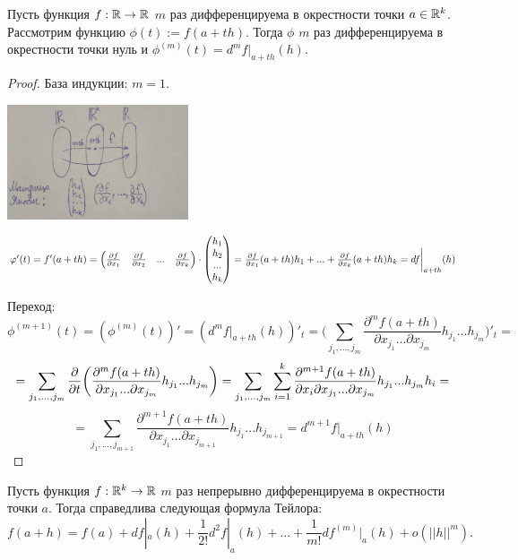     \begin{lemma}
    	Пусть функция $f: \mathbb R \rightarrow \mathbb R$ $m$ раз дифференцируема в окрестности точки $a \in \mathbb R^k$. Рассмотрим функцию $\phi(t) := f(a + th)$. Тогда $\phi$ $m$ раз дифференцируема в окрестности точки нуль и $\phi^{(m)}(t) = d^mf|_{a + th}(h)$.
    \end{lemma}
    
    \begin{proof}
    	База индукции: $m = 1$.
    	\begin{center}
    		\includegraphics[width=0.4\textwidth]{img/lecture39/matrix_yakobi}
    	\end{center}    	
    	$\varphi'(t) = f'(a + th) = \begin{pmatrix}
    		\frac{\partial f}{\partial x_1} & \frac{\partial f}{\partial x_2} & ... & \frac{\partial f}{\partial x_k}
    	\end{pmatrix} \cdot \begin{pmatrix}
    	h_1 \\
    	h_2 \\
    	... \\
    	h_k
    	\end{pmatrix} = \frac{\partial f}{\partial x_1}(a + th)h_1 + ... + \frac{\partial f}{\partial x_k}(a + th)h_k = df\bigg|_{a + th}(h)$
    	
    	Переход:
    	\[ \phi^{(m + 1)}(t) = (\phi^{(m)}(t))' = (d^mf|_{a + th}(h))'_t = \bigg(\sum_{j_1, ..., j_m} \frac{\partial^m f(a + th)}{\partial x_{j_1} ... \partial x_{j_m}} h_{j_1} ... h_{j_m}\bigg)'_t = \]
    	\[ = \sum_{j_1, ..., j_m} \frac{\partial }{\partial t} \bigg(\frac{\partial^m f(a + th)}{\partial x_{j_1} ... \partial x_{j_m}} h_{j_1} ... h_{j_m}\bigg) = \sum_{j_1, ..., j_m} \sum_{i = 1}^k \frac{\partial^{m + 1} f(a + th)}{\partial x_i \partial x_{j_1} ... \partial x_{j_m}} h_{j_1} ... h_{j_m} h_i = \]
    	\[ = \sum_{j_1, ..., j_{m + 1}} \frac{\partial^{m + 1} f(a + th)}{\partial x_{j_1} ... \partial x_{j_{m + 1}}} h_{j_1} ... h_{j_{m + 1}} = d^{m + 1}f|_{a + th}(h) \]
    \end{proof}
    
    \begin{theorem}
    	Пусть функция $f: \mathbb R^k \rightarrow \mathbb R$ $m$ раз непрерывно дифференцируема в окрестности точки $a$. Тогда справедлива следующая формула Тейлора:
    	\[ f(a + h) = f(a) + df|_a(h) + \frac{1}{2!}d^2 f|_a(h) + ... + \frac{1}{m!}df^{(m)}|_a(h) + o(||h||^m). \]
    \end{theorem}
    
